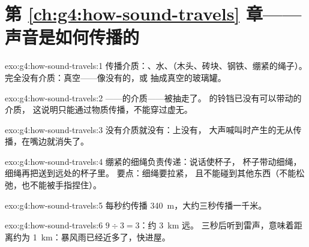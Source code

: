 \section*{第 \ref{ch:g4:how-sound-travels} 章——声音是如何传播的}

\begin{solution}{exo:g4:how-sound-travels:1}
传播介质：、水、（木头、砖块、钢铁、绷紧的绳子）。
完全没有介质：真空——像没有的，或
抽成真空的玻璃罐。
\end{solution}

\begin{solution}{exo:g4:how-sound-travels:2}
——的介质——被抽走了。
的铃铛已没有可以带动的介质，
这说明只能通过物质传播，不能穿过虚无。
\end{solution}

\begin{solution}{exo:g4:how-sound-travels:3}
没有介质就没有：上没有，
大声喊叫时产生的无从传播，在嘴边就消失了。
\end{solution}

\begin{solution}{exo:g4:how-sound-travels:4}
绷紧的细绳负责传递：说话使杯子，
杯子带动细绳，细绳再把送到远处的杯子里。
要点：细绳要拉紧，
且不能碰到其他东西（不能松弛，也不能被手指捏住）。
\end{solution}

\begin{solution}{exo:g4:how-sound-travels:5}
每秒约传播 \qty{340}{m}，大约三秒传播一千米。
\end{solution}

\begin{solution}{exo:g4:how-sound-travels:6}
$9 \div 3 = 3$：约 \qty{3}{km} 远。
三秒后听到雷声，意味着距离约为 \qty{1}{km}：暴风雨已经近多了，快进屋。
\end{solution}

